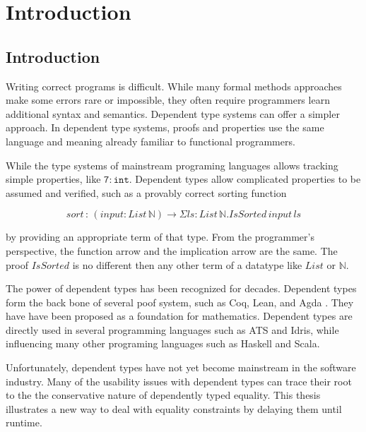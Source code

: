 \chapter{Introduction}
\label{chapter:Introduction}
\thispagestyle{myheadings}

\section{Introduction}

Writing correct programs is difficult. While many formal methods approaches
make some errors rare or impossible, they often require programmers
learn additional syntax and semantics. Dependent type systems can
offer a simpler approach. In dependent type systems, proofs and properties
use the same language and meaning already familiar to functional programmers.

While the type systems of mainstream programing languages allows tracking
simple properties, like $\mathtt{7:int}$. Dependent types allow complicated
properties to be assumed and verified, such as a provably correct
sorting function 

\[
sort\,:\,\left(input:List\,\mathbb{N}\right)\rightarrow\Sigma ls:List\,\mathbb{N}.IsSorted\,input\,ls
\]

by providing an appropriate term of that type. From the programmer's
perspective, the function arrow and the implication arrow are the
same. The proof $IsSorted$ is no different then any other term of
a datatype like $List$ or $\mathbb{N}$. 

The power of dependent types has been recognized for decades. Dependent
types form the back bone of several poof system, such as Coq\cite{Coq12},
Lean\cite{10.1007/978-3-030-79876-5_37}, and Agda\cite{norell2007towards}
. They have have been proposed as a foundation for mathematics\cite{Martin-Lof-1972,HoTTbook}.
Dependent types are directly used in several programming languages
such as ATS\cite{DependentMLAnapproachtopracticalprogrammingwithdependenttypes}
and Idris\cite{brady2013idris}, while influencing many other programing
languages such as Haskell and Scala. 

Unfortunately, dependent types have not yet become mainstream in the
software industry. Many of the usability issues with dependent types
can trace their root to the the conservative nature of dependently
typed equality. This thesis illustrates a new way to deal with equality
constraints by delaying them until runtime.

